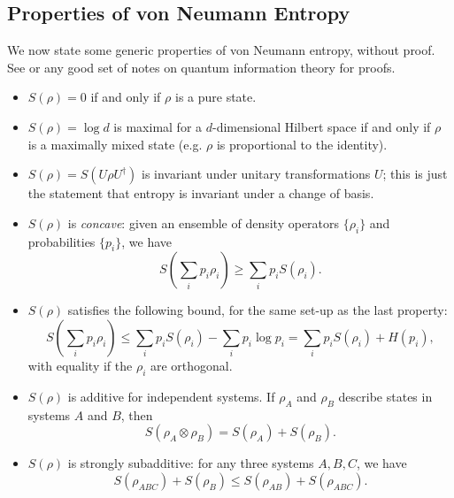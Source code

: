 \documentclass[12pt,a4paper]{report}
\numberwithin{equation}{section}
\theoremstyle{definition}
\theoremstyle{theorem}
\theoremstyle{theorem}
\theoremstyle{example}
\theoremstyle{definition}
\begin{document}
\subsection{Properties of von Neumann Entropy}
We now state some generic properties of von Neumann entropy, without proof. See \cite{NielsenChuang} or any good set of notes on quantum information theory for proofs.
\begin{itemize}
	\item $S(\rho)=0$ if and only if $\rho$ is a pure state.
	\item $S(\rho)=\log{d}$ is maximal for a $d$-dimensional Hilbert space if and only if $\rho$ is a maximally mixed state (e.g. $\rho$ is proportional to the identity).
	\item $S(\rho)=S(U\rho U^{\dagger})$ is invariant under unitary transformations $U$; this is just the statement that entropy is invariant under a change of basis.
	\item $S(\rho)$ is \textit{concave}: given an ensemble of density operators $\{\rho_{i}\}$ and probabilities $\{p_{i}\}$, we have
	\begin{equation}
		S\left(\sum_{i}p_{i}\rho_{i}\right)\geq\sum_{i}p_{i}S(\rho_{i}).
	\end{equation}
	\item $S(\rho)$ satisfies the following bound, for the same set-up as the last property:
	\begin{equation}
		S\left(\sum_{i}p_{i}\rho_{i}\right)\leq\sum_{i}p_{i}S(\rho_{i})-\sum_{i}p_{i}\log{p_{i}}=\sum_{i}p_{i}S(\rho_{i})+H(p_{i}),
	\end{equation}
	with equality if the $\rho_{i}$ are orthogonal.
	\item $S(\rho)$ is additive for independent systems. If $\rho_{A}$ and $\rho_{B}$ describe states in systems $A$ and $B$, then
	\begin{equation}
		S(\rho_{A}\otimes\rho_{B})=S(\rho_{A})+S(\rho_{B}).
	\end{equation}
	\item $S(\rho)$ is strongly subadditive: for any three systems $A,B,C$, we have
	\begin{equation}
		S(\rho_{ABC})+S(\rho_{B})\leq S(\rho_{AB})+S(\rho_{ABC}).
	\end{equation}
\end{itemize}
\end{document}
